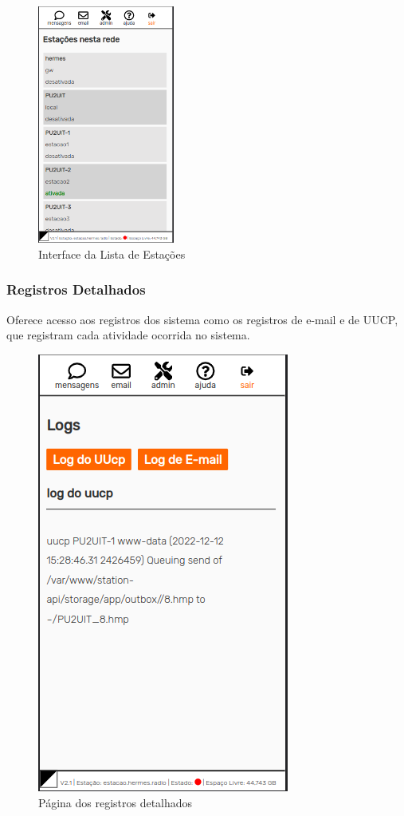 \documentclass[11pt,a4paper]{article}
\begin{document}
\begin{figure}[H]
    \centering
    \includegraphics[width=0.4\textwidth]{screenshots/frontend/pt_kn/stations.png}
    \caption{Interface da Lista de Estações}
    \vspace{-10pt}
    \label{fig:stations}
\end{figure} 


    
\subsubsection{Registros Detalhados}
Oferece acesso aos registros dos sistema como os registros de e-mail e de UUCP, que registram cada atividade ocorrida no sistema.
    
    \begin{figure}[H]
    \centering
    \includegraphics[width=0.5\columnwidth]{screenshots/frontend/pt_kn/logs.png}
    \caption{Página dos registros detalhados}
    \label{fig:logs}
\end{figure}
\end{document}
